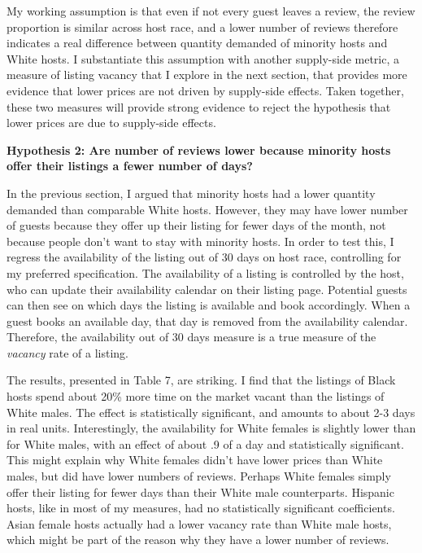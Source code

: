 \documentclass[11pt, oneside]{article}
\begin{document}
My working assumption is that even if not every guest leaves a review, the review proportion is similar across host race, and a lower number of reviews therefore indicates a real difference between quantity demanded of minority hosts and White hosts. I substantiate this assumption with another supply-side metric, a measure of listing vacancy that I explore in the next section, that provides more evidence that lower prices are not driven by supply-side effects. Taken together, these two measures will provide strong evidence to reject the hypothesis that lower prices are due to supply-side effects. 
    
    
\textbf{Hypothesis 2: Are number of reviews lower because minority hosts offer their listings a fewer number of days?}

In the previous section, I argued that minority hosts had a lower quantity demanded than comparable White hosts. However, they may have lower number of guests because they offer up their listing for fewer days of the month, not because people don't want to stay with minority hosts. In order to test this, I regress the availability of the listing out of 30 days on host race, controlling for my preferred specification. The availability of a listing is controlled by the host, who can update their availability calendar on their listing page. Potential guests can then see on which days the listing is available and book accordingly. When a guest books an available day, that day is removed from the availability calendar. Therefore, the availability out of 30 days measure is a true measure of the \textit{vacancy} rate of a listing.

The results, presented in Table 7, are striking. I find that the listings of Black hosts spend about 20\% more time on the market vacant than the listings of White males. The effect is statistically significant, and amounts to about 2-3 days in real units. Interestingly, the availability for White females is slightly lower than for White males, with an effect of about .9 of a day and statistically significant. This might explain why White females didn't have lower prices than White males, but did have lower numbers of reviews. Perhaps White females simply offer their listing for fewer days than their White male counterparts. Hispanic hosts, like in most of my measures, had no statistically significant coefficients. Asian female hosts actually had a lower vacancy rate than White male hosts, which might be part of the reason why they have a lower number of reviews. 
\end{document}
